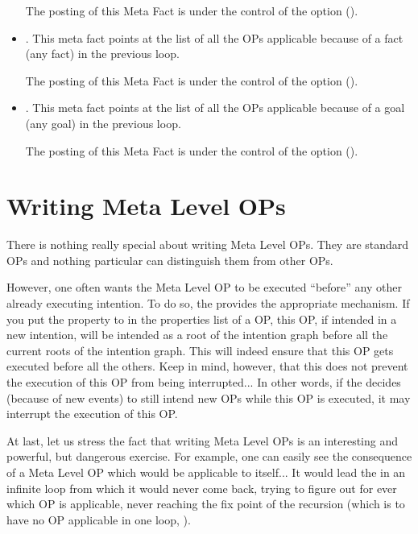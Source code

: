 \begin{itemize}
The posting of this Meta Fact is under the control of the 
option ().

\item {}. This meta fact points at
the list of all the OPs applicable because of a fact (any fact) in the previous
loop.

The posting of this Meta Fact is under the control of the 
option ().

\item {}.  This meta fact points
at the list of all the OPs applicable because of a goal (any goal) in the
previous loop.

The posting of this Meta Fact is under the control of the 
option ().

\end{itemize}

\section{Writing Meta Level OPs}

There is nothing really special about writing Meta Level OPs. They are
standard OPs and nothing particular can distinguish them from other OPs.

However, one often wants the Meta Level OP to be executed ``before''
any other already executing intention. To do so, the \CPK{}
provides the appropriate mechanism. If you put the property
 to  in the properties list of a OP, this OP,
if intended in a new intention, will be intended as a root of the intention
graph before all the current roots of the intention graph. This will indeed
ensure that this OP gets executed before all the others. Keep in mind, however,
that this does not prevent the execution of this OP from being interrupted...
In other words, if the \CPK{} decides (because of new events) to still intend
new OPs while this OP is executed, it may interrupt the execution of this OP.

At last, let us stress the fact that writing Meta Level OPs is an interesting
and powerful, but dangerous exercise. For example, one can easily see the
consequence of a Meta Level OP which would be applicable to itself... It would
lead the \CPK{} in an infinite loop from which it would never come back, trying
to figure out for ever which OP is applicable, never reaching the fix point of
the recursion (which is to have no OP applicable in one loop, ).

